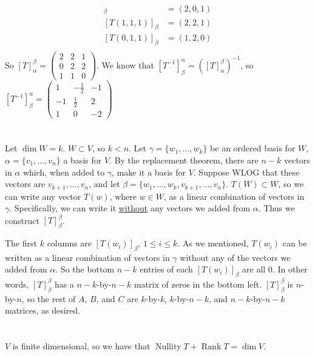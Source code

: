 \documentclass[11pt]{article}
\DeclareMathOperator{\nullity}{Nullity}
\DeclareMathOperator{\rank}{Rank}
\begin{document}
\begin{align*}
	[T(1,1,0)]_\beta&=(2,0,1)\\
	[T(1,1,1)]_\beta&=(2,2,1)\\
	[T(0,1,1)]_\beta&=(1,2,0)\\
\end{align*}
So $[T]_\alpha^\beta=\left(\begin{smallmatrix}2&2&1\\0&2&2\\1&1&0\end{smallmatrix}\right)$.
	We know that $[T^{-1}]_\beta^\alpha=([T]_\alpha^\beta)^{-1}$, so $[T^{-1}]_\beta^\alpha=\left(\begin{smallmatrix}1&-\frac{1}{2}&-1\\-1&\frac{1}{2}&2\\1&0&-2\end{smallmatrix}\right)$


\section{} %
Let $\dim W=k$. $W\subset V$, so $k<n$. Let $\gamma=\{w_1,\ldots,w_k\}$ be an
ordered basis for $W$, $\alpha=\{v_1,\ldots,v_n\}$ a basis for $V$. By the
replacement theorem, there are $n-k$ vectors in $\alpha$ which, when added to
$\gamma$, make it a basis for $V$. Suppose WLOG that these vectors are
$v_{k+1},\ldots,v_n$, and let $\beta=\{w_1,\ldots,w_k,v_{k+1},\ldots,v_n\}$.
$T(W)\subset W$, so we can write any vector $T(w)$, where $w\in W$, as a
linear combination of vectors in $\gamma$. Specifically, we can write it
\underline{without} any vectors we added from $\alpha$. Thus we construct
$[T]_\beta^\beta$.

The first $k$ columns are $[T(w_i)]_\beta$, $1\le i\le k$. As we mentioned,
$T(w_i)$ can be written as a linear combination of vectors in $\gamma$ without
any of the vectors we added from $\alpha$. So the bottom $n-k$ entries of each
$[T(w_i)]_\beta$ are all 0. In other words, $[T]_\beta^\beta$ has a
$n-k$-by-$n-k$ matrix of zeros in the bottom left. $[T]_\beta^\beta$ is
$n$-by-$n$, so the rest of $A$, $B$, and $C$ are $k$-by-$k$, $k$-by-$n-k$, and
$n-k$-by-$n-k$ matrices, as desired.


\section{} %
$V$ is finite dimensional, so we have that $\nullity T+\rank T=\dim V$.
\end{document}
